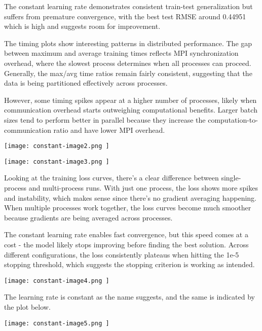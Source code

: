 \documentclass{article}
\begin{document}
The constant learning rate demonstrates consistent train-test generalization but suffers from premature convergence, with the best test RMSE around 0.44951 which is high and suggests room for improvement.

The timing plots show interesting patterns in distributed performance. The gap between maximum and average training times reflects MPI synchronization overhead, where the slowest process determines when all processes can proceed. Generally, the max/avg time ratios remain fairly consistent, suggesting that the data is being partitioned effectively across processes. 

However, some timing spikes appear at a higher number of processes, likely when communication overhead starts outweighing computational benefits. 
Larger batch sizes tend to perform better in parallel because they increase the computation-to-communication ratio and have lower MPI overhead.

\begin{center}
\texttt{[image: constant-image2.png ]}
\end{center}

\begin{center}
\texttt{[image: constant-image3.png ]}
\end{center}

Looking at the training loss curves, there's a clear difference between single-process and multi-process runs. With just one process, the loss shows more spikes and instability, which makes sense since there's no gradient averaging happening. When multiple processes work together, the loss curves become much smoother because gradients are being averaged across processes.

The constant learning rate enables fast convergence, but this speed comes at a cost - the model likely stops improving before finding the best solution. Across different configurations, the loss consistently plateaus when hitting the 1e-5 stopping threshold, which suggests the stopping criterion is working as intended.

\begin{center}
\texttt{[image: constant-image4.png ]}
\end{center}

The learning rate is constant as the name suggests, and the same is indicated by the plot below.

\begin{center}
\texttt{[image: constant-image5.png ]}
\end{center}
\end{document}
